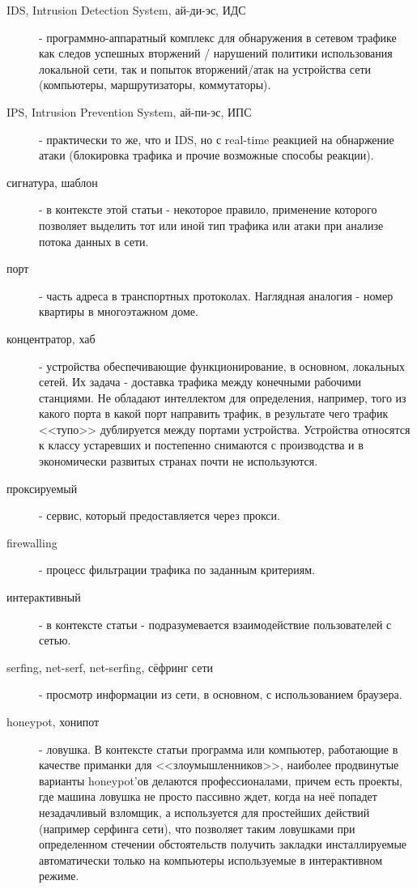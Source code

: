 \begin{description}
\item[IDS, Intrusion Detection System, ай-ди-эс, ИДС ]
 - программно-аппаратный комплекс для обнаружения в сетевом трафике как следов успешных
вторжений / нарушений политики использования локальной сети, так и попыток вторжений/атак
 на устройства сети (компьютеры, маршрутизаторы, коммутаторы).

\item[IPS, Intrusion Prevention System, ай-пи-эс, ИПС ]
 - практически то же, что и IDS, но с real-time реакцией на обнаржение атаки (блокировка трафика
и прочие возможные способы реакции).

\item[сигнатура, шаблон]
- в контексте этой статьи - некоторое правило, применение которого позволяет выделить тот или иной тип трафика или атаки при анализе потока данных в сети.

\item[порт]
 - часть адреса в транспортных протоколах. Наглядная аналогия - номер квартиры в многоэтажном доме.

\item[концентратор, хаб]
 - устройства обеспечивающие функционирование, в основном, локальных сетей. Их задача - доставка трафика между конечными рабочими станциями. Не обладают интеллектом для определения, например, того из какого порта в какой порт направить трафик, в результате чего трафик <<тупо>> дублируется между портами устройства. Устройства относятся к классу устаревших и постепенно снимаются с производства и в экономически развитых странах почти не используются.

\item[проксируемый]
 - сервис, который предоставляется через прокси.

\item[firewalling]
 - процесс фильтрации трафика по заданным критериям.

\item[интерактивный]
 - в контексте статьи - подразумевается взаимодействие пользователей с сетью.

\item[serfing, net-serf, net-serfing, сёфринг сети]
 - просмотр информации из сети, в основном, с использованием браузера.

\item[honeypot, хонипот]
 - ловушка. В контексте статьи программа или компьютер, работающие в качестве приманки для
 <<злоумышленников>>, наиболее продвинутые варианты honeypot'ов делаются профессионалами,
 причем есть проекты, где машина ловушка не просто пассивно ждет, когда на неё попадет
 незадачливый взломщик, а используется для простейших действий (например серфинга сети),
 что позволяет таким ловушками при определенном стечении обстоятельств получить закладки
 инсталлируемые автоматически только на компьютеры используемые в интерактивном режиме.


\end{description}
